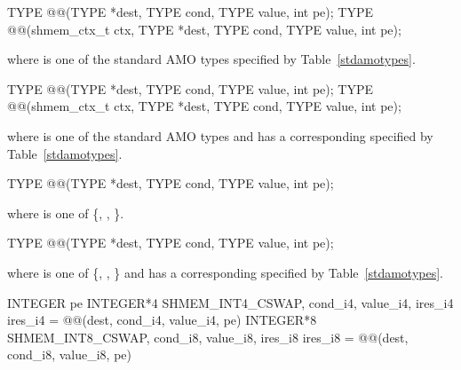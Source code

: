 
\begin{apidefinition}

\begin{C11synopsis}
TYPE @@(TYPE *dest, TYPE cond, TYPE value, int pe);
TYPE @@(shmem_ctx_t ctx, TYPE *dest, TYPE cond, TYPE value, int pe);
\end{C11synopsis}
where \TYPE{} is one of the standard \ac{AMO} types specified by
Table~\ref{stdamotypes}.

\begin{Csynopsis}
TYPE @@(TYPE *dest, TYPE cond, TYPE value, int pe);
TYPE @@(shmem_ctx_t ctx, TYPE *dest, TYPE cond, TYPE value, int pe);
\end{Csynopsis}
where \TYPE{} is one of the standard \ac{AMO} types and has a corresponding
\TYPENAME{} specified by Table~\ref{stdamotypes}.

\begin{DeprecateBlock}
\begin{C11synopsis}
TYPE @@(TYPE *dest, TYPE cond, TYPE value, int pe);
\end{C11synopsis}
where \TYPE{} is one of \{, , \}.

\begin{Csynopsis}
TYPE @@(TYPE *dest, TYPE cond, TYPE value, int pe);
\end{Csynopsis}
where \TYPE{} is one of \{, , \}
and has a corresponding \TYPENAME{} specified by Table~\ref{stdamotypes}.
\end{DeprecateBlock}

\begin{Fsynopsis}
INTEGER pe
INTEGER*4 SHMEM_INT4_CSWAP,  cond_i4, value_i4, ires_i4
ires\_i4 = @@(dest, cond_i4, value_i4, pe)
INTEGER*8 SHMEM_INT8_CSWAP,  cond_i8, value_i8, ires_i8
ires\_i8 = @@(dest, cond_i8, value_i8, pe)
\end{Fsynopsis}


\end{apidefinition}
